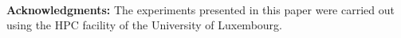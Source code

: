 \documentclass{llncs}
\begin{document}
~\\
{\noindent \textbf{Acknowledgments:}}
The experiments presented in this paper were carried
out using the HPC facility of the University of Luxembourg.
%
%

%



\appendix


\end{document}
